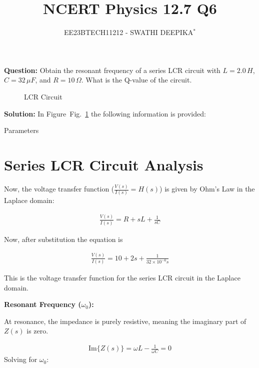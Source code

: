 \documentclass[journal,12pt,twocolumn]{IEEEtran}
\title{
	
\title{NCERT Physics 12.7 Q6}
\author{EE23BTECH11212 - SWATHI DEEPIKA$^{*}$%
}


}
\newcommand\figref{Fig.~\ref}
\theoremstyle{remark}
\begin{document}
\maketitle

\textbf{Question:} 
Obtain the resonant frequency of a series LCR circuit with $L = 2.0\, H$, $C = 32\, \mu F$, and $R = 10\, \Omega$. What is the Q-value of the circuit.\\

\begin{figure}[h]
	\centering
	
	\caption{LCR Circuit}
	\label{fig:2}
\end{figure}
     
\textbf{Solution: }
In Figure~\figref{fig:2} the following information is provided:
 
 

 \begin{table}[h]
 	\centering
 	\resizebox{6 cm}{!}{
 		
 	}
 	\vspace{6 pt}
 	\caption{Parameters}
 	\label{tab:my_label} 
 \end{table}
 

\section*{Series LCR Circuit Analysis}

Now, the voltage transfer function (\(\frac{V(s)}{I(s)} = H(s)\)) is given by Ohm's Law in the Laplace domain:

\begin{align}
\frac{V(s)}{I(s)} = R + sL + \frac{1}{sC} 
\end{align}

Now, after substitution the equation is 

\begin{align}
\frac{V(s)}{I(s)} = 10 + 2s + \frac{1}{32 \times 10^{-6}s}
\end{align}

This is the voltage transfer function for the series LCR circuit in the Laplace domain.

\textbf{Resonant Frequency (\(\omega_0\)):}

At resonance, the impedance is purely resistive, meaning the imaginary part of \(Z(s)\) is zero.

\begin{align}
\text{Im}\{Z(s)\} = \omega L - \frac{1}{\omega C} = 0
\end{align}
Solving for \(\omega_0\):
\end{document}
